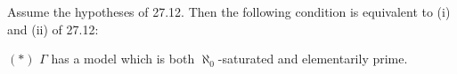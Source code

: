 Assume the hypotheses of 27.12. Then the following condition is equivalent to (i) and (ii) of 27.12:

$(*)$ $\Gamma$ has a model which is both $\aleph_0$-saturated and elementarily prime.
